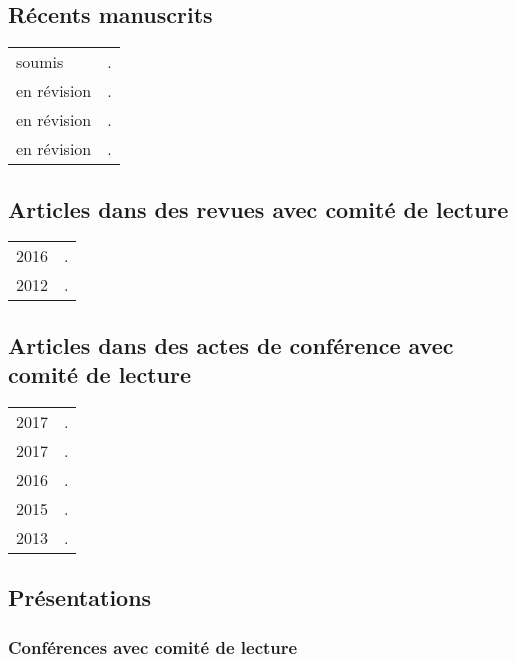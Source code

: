 \documentclass[11pt,a4paper,twoside,french]{article}
\makeatletter
\newenvironment{cvsection}{%
  \setlength{\extrarowheight}{0.70ex}
  \begin{longtable}[l]{@{} L R @{}}
}{%
  \end{longtable}
}
\makeatother
\begin{document}
\subsection*{Récents manuscrits}

\begin{cvsection}
  soumis & .\\
  en révision & .\\
  en révision & .\\
  en révision & .\\
\end{cvsection}

\subsection*{Articles dans des revues avec comité de lecture}

\begin{cvsection}
  2016 & .\\
  2012 & .\\
\end{cvsection}

\subsection*{Articles dans des actes de conférence avec comité de lecture}

\begin{cvsection}
  2017 & .\\
  2017 & .\\
  2016 & .\\
  2015 & .\\
  2013 & .\\
\end{cvsection}

\subsection*{Présentations}

\subsubsection*{Conférences avec comité de lecture}
\end{document}
